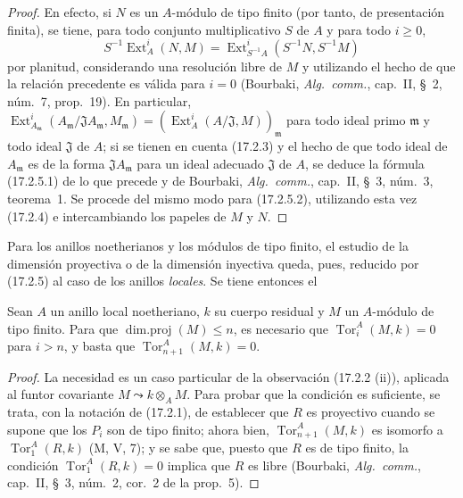 \begin{proof}
En efecto, si $N$ es un $A$-módulo de tipo finito (por tanto, de presentación finita),
se tiene, para todo conjunto multiplicativo $S$ de $A$ y para todo $i\geq0$,
\[
  S^{-1}\operatorname{Ext}^i_A(N,M)
  =\operatorname{Ext}^i_{S^{-1}A}(S^{-1}N,S^{-1}M)
\]
por planitud, considerando una resolución libre de $M$ y utilizando el
hecho de que la relación precedente es válida para $i=0$ (Bourbaki,
\emph{Alg.~comm.}, cap.~II, \S~2, núm.~7, prop.~19). En particular,
$\operatorname{Ext}^i_{A_{\mathfrak{m}}}
(A_{\mathfrak{m}}/\mathfrak{J}A_{\mathfrak{m}},M_{\mathfrak{m}})
=(\operatorname{Ext}^i_A(A/\mathfrak{J},M))_{\mathfrak{m}}$ para todo ideal
primo $\mathfrak{m}$ y todo ideal $\mathfrak{J}$ de $A$; si se tienen
en cuenta (17.2.3) y el hecho de que todo
ideal de $A_{\mathfrak{m}}$ es de la forma $\mathfrak{J}A_{\mathfrak{m}}$
para un ideal adecuado $\mathfrak{J}$ de $A$, se deduce la fórmula
(17.2.5.1) de lo que precede y de Bourbaki, \emph{Alg.~comm.}, cap.~II,
\S~3, núm.~3, teorema~1. Se procede del mismo modo para (17.2.5.2), utilizando esta vez
(17.2.4) e intercambiando los papeles de $M$ y $N$.
\end{proof}

Para los anillos noetherianos y los módulos de tipo finito, el estudio de la
dimensión proyectiva o de la dimensión inyectiva queda, pues, reducido por
(17.2.5) al caso de los anillos \emph{locales}. Se tiene entonces el

\begin{lemma}[17.2.6]
\label{0.17.2.6-es}
Sean $A$ un anillo local noetheriano, $k$ su cuerpo residual y $M$ un
$A$-módulo de tipo finito. Para que $\operatorname{dim.proj}(M)\leq n$, es
necesario que $\operatorname{Tor}^A_i(M,k)=0$ para $i>n$, y basta que
$\operatorname{Tor}^A_{n+1}(M,k)=0$.
\end{lemma}

\begin{proof}
La necesidad es un caso particular de la observación (17.2.2 (ii)), aplicada al
funtor covariante $M\leadsto k\otimes_A M$. Para probar que la condición es
suficiente, se trata, con la notación de (17.2.1), de establecer que $R$ es
proyectivo cuando se supone que los $P_i$ son de tipo finito; ahora bien,
$\operatorname{Tor}^A_{n+1}(M,k)$ es isomorfo a
$\operatorname{Tor}^A_1(R,k)$ (M, V, 7); y se sabe que, puesto que $R$ es de
tipo finito, la condición $\operatorname{Tor}^A_1(R,k)=0$ implica que $R$ es
libre (Bourbaki, \emph{Alg.~comm.}, cap.~II, \S~3, núm.~2, cor.~2 de la
prop.~5).
\end{proof}

